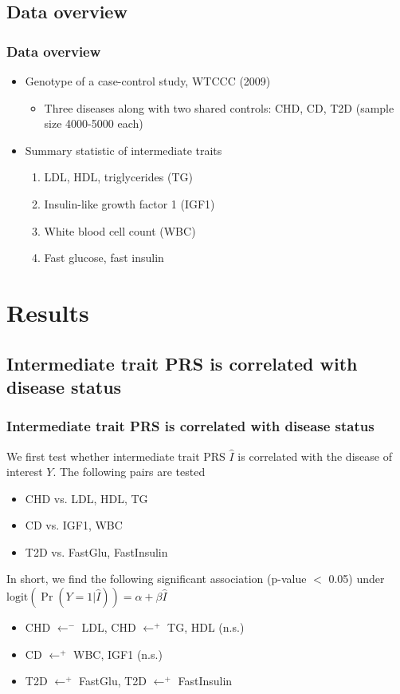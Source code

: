 \documentclass{beamer}
\newcommand\logit{\text{logit}}
\begin{document}
  \subsection{Data overview}
  \begin{frame}
  \frametitle{Data overview}
    \begin{itemize}
      \item Genotype of a case-control study, WTCCC (2009) \cite{wellcome2007genome}
        \begin{itemize}
          \item Three diseases along with two shared controls: CHD, CD, T2D (sample size 4000-5000 each)
        \end{itemize}
      \item Summary statistic of intermediate traits
        \begin{enumerate}
          \item LDL, HDL, triglycerides (TG) \cite{kettunen2016genome}
          \item Insulin-like growth factor 1 (IGF1) \cite{prins2017genome}
          \item White blood cell count (WBC) \cite{astle2016allelic}
          \item Fast glucose, fast insulin \cite{manning2012genome}
        \end{enumerate}
    \end{itemize}
  \end{frame}

\section{Results}

  \subsection{Intermediate trait PRS is correlated with disease status}
  \begin{frame}
  \frametitle{Intermediate trait PRS is correlated with disease status}
    We first test whether intermediate trait PRS $\hat{I}$ is correlated with the disease of interest $Y$. The following pairs are tested
    \begin{itemize}
      \item CHD vs. LDL, HDL, TG
      \item CD vs. IGF1, WBC
      \item T2D vs. FastGlu, FastInsulin
    \end{itemize}
    In short, we find the following significant association (p-value $<$ 0.05) under $\logit(\Pr(Y = 1|\hat{I})) = \alpha + \beta \hat{I}$
    \begin{itemize}
      \item CHD $\leftarrow^{-}$ LDL, CHD $\leftarrow^{+}$ TG, HDL (n.s.)
      \item CD $\leftarrow^{+}$ WBC, IGF1 (n.s.)
      \item T2D $\leftarrow^{+}$ FastGlu, T2D $\leftarrow^{+}$ FastInsulin
    \end{itemize}
  \end{frame}
\end{document}
